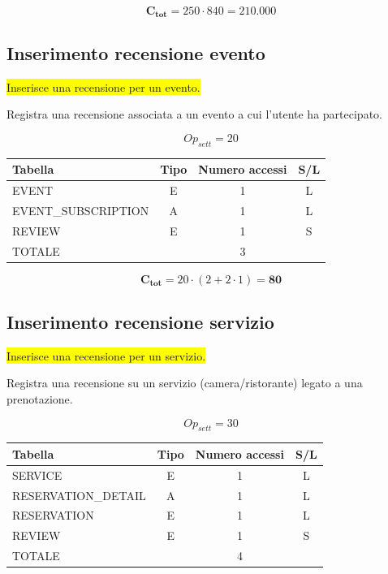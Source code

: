 \documentclass[a4paper,12pt]{report}
\begin{document}
$$\mathbf{C_{tot}} = 250 \cdot 840 = \mathbf{210.000}$$

\subsection*{Inserimento recensione evento} \label{op9}
\colorbox{yellow}{Inserisce una recensione per un evento.}

Registra una recensione associata a un evento a cui l'utente ha partecipato.

$$Op_{sett} = 20$$

\begin{table}[H]
  \centering
  \small
  \renewcommand{\arraystretch}{1.15}
  \begin{tabularx}{0.8\textwidth}{|X|c|c|c|}
    \hline
    \rowcolor{gray!20}
    \textbf{Tabella} & \textbf{Tipo} & \textbf{Numero accessi} & \textbf{S/L} \\
    \hline
    EVENT & E & 1 & L \\
    EVENT\_SUBSCRIPTION & A & 1 & L \\
    REVIEW & E & 1 & S \\
    \hline
    \rowcolor{gray!20}
    TOTALE & & 3 & \\
    \hline
  \end{tabularx}
  \vspace{-1em}
\end{table}

$$\mathbf{C_{tot}} = 20 \cdot (2 + 2 \cdot 1) = \mathbf{80}$$

\subsection*{Inserimento recensione servizio} \label{op10}
\colorbox{yellow}{Inserisce una recensione per un servizio.}

Registra una recensione su un servizio (camera/ristorante) legato a
una prenotazione.

$$Op_{sett} = 30$$

\begin{table}[H]
  \centering
  \small
  \renewcommand{\arraystretch}{1.15}
  \begin{tabularx}{0.8\textwidth}{|X|c|c|c|}
    \hline
    \rowcolor{gray!20}
    \textbf{Tabella} & \textbf{Tipo} & \textbf{Numero accessi} & \textbf{S/L} \\
    \hline
    SERVICE & E & 1 & L \\
    RESERVATION\_DETAIL & A & 1 & L \\
    RESERVATION & E & 1 & L \\
    REVIEW & E & 1 & S \\
    \hline
    \rowcolor{gray!20}
    TOTALE & & 4 & \\
    \hline
  \end{tabularx}
  \vspace{-1em}
\end{table}
\end{document}
